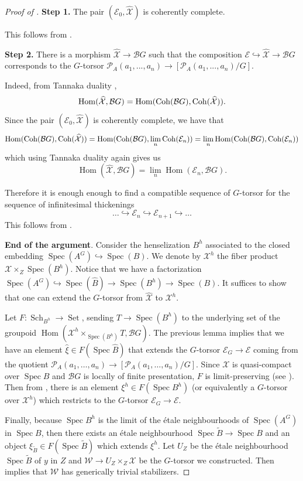 \documentclass{amsart}
\newcommand{\cB}{\mathcal{B}}
\newcommand{\cE}{\mathcal{E}}
\newcommand{\cP}{\mathcal{P}}
\newcommand{\cW}{\mathcal{W}}
\newcommand{\cX}{\mathcal{X}}
\newcommand{\spec}{\operatorname{Spec}}
\newcommand{\Hom}{\operatorname{Hom}}
\theoremstyle{definition}
\begin{document}
\begin{proof}[Proof of ]
\textbf{Step 1.} The pair $(\cE_0, \widehat{\cX})$ is coherently complete. 

    This follows from \cite[Thm. 1.4]{Olsson}.


\textbf{Step 2.}
    There is a morphism $\widehat{\cX} \rightarrow \cB G$ such that the composition $\cE \hookrightarrow \widehat{\cX} \rightarrow \cB G$ corresponds to the $G$-torsor $\cP_A(a_1,...,a_n)\to [\cP_A(a_1,...,a_n)/G]$.
    
Indeed, from Tannaka duality \cite[Thm. 1.1]{HR19},
 $$\Hom(\widehat{\cX},\cB G) = \Hom( {\rm Coh}(\cB G), {\rm Coh}(\widehat{\cX})).$$
 Since the pair  $(\cE_0, \widehat{\cX})$ is coherently complete, we have that 
 $$ \Hom({\rm Coh}(\cB G), {\rm Coh}(\widehat{\cX})) =  \Hom({\rm Coh}(\cB G), \lim_n {\rm Coh}(\cE_n))= \lim_n \Hom({\rm Coh}(\cB G), {\rm Coh}(\cE_n))  $$
 which using Tannaka duality again gives us 
 $$ \Hom(\widehat{\cX}, \cB G) = \lim_n \Hom(\cE_n, \cB G).$$

Therefore it is enough enough to find a compatible sequence of $G$-torsor for the sequence of infinitesimal thickenings $$\dots \hookrightarrow \cE_n \hookrightarrow \cE_{n+1} \hookrightarrow \dots$$
This follows from . 

\textbf{End of the argument}. Consider the henselization $B^h$ associated to the closed embedding $\spec(A^G) \hookrightarrow \spec (B)$.  We denote by $\cX^h$ the fiber product $\cX \times_{Z} \spec(B^h)$. Notice that we have a factorization $\spec(A^G)\hookrightarrow \spec (\widehat{B}) \rightarrow \spec( B^h) \rightarrow \spec (B)$. It suffices to show that one can extend the $G$-torsor from $\widehat{\cX}$ to $\cX^h$. 

Let $F:\operatorname{Sch}_{B^h}\to \operatorname{Set}$, sending $T\to \spec(B^h)$ to the underlying set of the groupoid $\Hom(\cX^h \times_{\spec(B^h)} T, \cB G)$. The previous lemma implies that we have an element $\widehat{\xi} \in F(\spec \widehat{B})$ that extends the $G$-torsor $\cE_G \rightarrow \cE$ {coming from the quotient $\cP_A(a_1,\ldots,a_n)\to [\cP_A(a_1,\ldots,a_n)/G]$}. Since $\cX$ is quasi-compact over $\spec B$ and $\cB G$ is locally of finite presentation, $F$  is limit-preserving (see \cite[Prop. 4.18]{LMB}). Then from \cite[Thm. 3.4]{AlperHallRydh}, there is an element $\xi^h \in F(\spec B^h)$ (or equivalently a $G$-torsor over $\cX^h$) which restricts to the $G$-torsor $\cE_G \rightarrow \cE$. 

Finally, because $\spec B^h$ is the limit of the \'etale neighbourhoods of $\spec (A^G)$ in $\spec B$, then there exists an \'etale neighbourhood $\spec \widetilde{B} \rightarrow \spec B$ and an object $\xi_{\widetilde{B}} \in F(\spec \widetilde{B})$ which extends $\xi^h$. Let $U_Z$ be the \'etale neighbourhood $\spec \widetilde{B}$ of $y$ in $Z$ and $\cW \rightarrow U_Z\times_Z \cX$ be the $G$-torsor we constructed. Then  implies that $\cW$ has generically trivial stabilizers.\end{proof}
\end{document}
